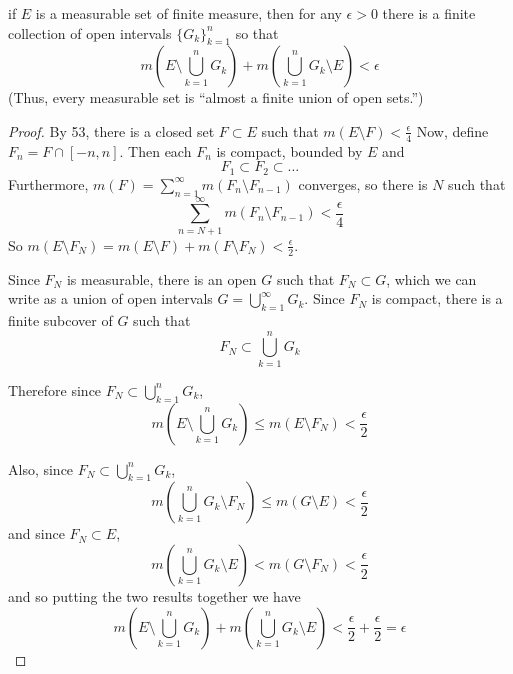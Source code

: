 \begin{pblm}%
	if $E$ is a measurable set of finite measure, then for any $\epsilon > 0$ 
	there is a finite collection of open intervals $\{G_k\}_{k=1}^n$ so that 
	\begin{equation*}
		m\left(E\setminus\bigcup\limits_{k=1}^nG_k\right) + 
		m\left(\bigcup\limits_{k=1}^nG_k\setminus E\right) < \epsilon
	\end{equation*}
	(Thus, every measurable set is ``almost a finite union of open sets.'')
\begin{proof}
	By 53, there is a closed set $F \subset E$ such that 
	$m(E \setminus F) < \frac{\epsilon}{4}$
	Now, define $F_n = F \cap [-n,n]$. Then each $F_n$ is compact, bounded by $E$ 
	and 
	\begin{equation*}
		F_1 \subset F_2 \subset \dots
	\end{equation*}
	Furthermore, $m(F) = \sum\limits_{n=1}^\infty m(F_n \setminus F_{n-1})$ converges, 
	so there is $N$ such that 
	\begin{equation*}
		\sum\limits_{n=N+1}^\infty m(F_n\setminus F_{n-1}) < \frac{\epsilon}{4}
	\end{equation*}
	So $m(E \setminus F_N) = m(E \setminus F) + m(F \setminus F_N) < \frac{\epsilon}{2}$. 

	Since $F_N$ is measurable, there is an open $G$ such that $F_N \subset G$, which 
	we can write as a union of open intervals $G = \bigcup\limits_{k=1}^\infty G_k$. 
	Since $F_N$ is compact, there is a finite subcover of $G$ such that 
	\begin{equation*}
		F_N \subset \bigcup\limits_{k=1}^nG_k
	\end{equation*}

	Therefore since $F_N \subset \bigcup\limits_{k=1}^nG_k$, 
	\begin{equation*}
		m\left(E \setminus \bigcup\limits_{k=1}^nG_k\right) \le m(E \setminus F_N) < \frac{\epsilon}{2}
	\end{equation*}

	Also, since $F_N \subset \bigcup\limits_{k=1}^nG_k$, 
	\begin{equation*}
		m\left(\bigcup\limits_{k=1}^nG_k\setminus F_N\right) \le 
		m\left(G\setminus E\right) < \frac{\epsilon}{2}
	\end{equation*}
	and since $F_N \subset E$, 
	\begin{equation*}
		m\left(\bigcup\limits_{k=1}^n G_k \setminus E\right) < 
		m\left(G\setminus F_N\right) < \frac{\epsilon}{2}
	\end{equation*}
	and so putting the two results together we have 
	\begin{equation*}
		m\left(E\setminus\bigcup\limits_{k=1}^nG_k\right) + 
		m\left(\bigcup\limits_{k=1}^nG_k\setminus E\right) < 
		\frac{\epsilon}{2}+\frac{\epsilon}{2}=\epsilon
	\end{equation*}
\end{proof}
\end{pblm}


